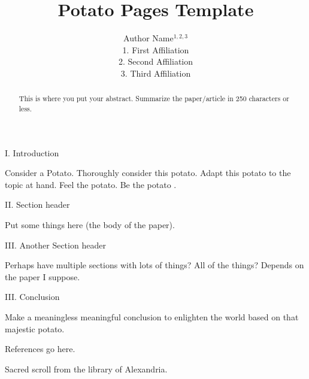 \documentclass[11pt]{article}
\title{Potato Pages Template}
\author{Author Name$^{1,2,3}$\\ \scriptsize{1. First Affiliation} \\ \scriptsize{2. Second Affiliation} \\ \scriptsize{3. Third Affiliation}}
\date{}
\begin{document}
\maketitle
\thispagestyle{fancy}

\begin{abstract}
	This is where you put your abstract. Summarize the paper/article in 250 characters or less.
\end{abstract}

\begin{multicols}{2}
	
\begin{center}
	I. Introduction
\end{center}

Consider a Potato. Thoroughly consider this potato. Adapt this potato to the topic at hand. Feel the potato. Be the potato \cite{scroll}.

\begin{center}
	II. Section header
\end{center}

Put some things here (the body of the paper). 

\begin{center}
	III. Another Section header
\end{center}

Perhaps have multiple sections with lots of things? All of the things? Depends on the paper I suppose.

\begin{center}
	III. Conclusion
\end{center}

Make a meaningless meaningful conclusion to enlighten the world based on that majestic potato. 


\begin{thebibliography}{9}
	{\footnotesize
	 References go here.
	
	 Sacred scroll from the library of Alexandria. 
	}
\end{thebibliography}
\end{multicols}

\end{document}
